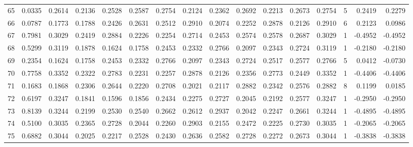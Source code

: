 \begin{tabular}{lrrrrrrrrrrrrrrr}
65  &      0.0335 &  0.2614 &  0.2136 &  0.2528 &  0.2587 &  0.2754 &  0.2124 &  0.2362 &  0.2692 &  0.2213 &   0.2673 &     0.2754 &      5 &                    0.2419 &                     0.2279 \\
66  &      0.0787 &  0.1773 &  0.1788 &  0.2426 &  0.2631 &  0.2512 &  0.2910 &  0.2074 &  0.2252 &  0.2878 &   0.2126 &     0.2910 &      6 &                    0.2123 &                     0.0986 \\
67  &      0.7981 &  0.3029 &  0.2419 &  0.2884 &  0.2226 &  0.2254 &  0.2714 &  0.2453 &  0.2574 &  0.2578 &   0.2687 &     0.3029 &      1 &                   -0.4952 &                    -0.4952 \\
68  &      0.5299 &  0.3119 &  0.1878 &  0.1624 &  0.1758 &  0.2453 &  0.2332 &  0.2766 &  0.2097 &  0.2343 &   0.2724 &     0.3119 &      1 &                   -0.2180 &                    -0.2180 \\
69  &      0.2354 &  0.1624 &  0.1758 &  0.2453 &  0.2332 &  0.2766 &  0.2097 &  0.2343 &  0.2724 &  0.2517 &   0.2577 &     0.2766 &      5 &                    0.0412 &                    -0.0730 \\
70  &      0.7758 &  0.3352 &  0.2322 &  0.2783 &  0.2231 &  0.2257 &  0.2878 &  0.2126 &  0.2356 &  0.2773 &   0.2449 &     0.3352 &      1 &                   -0.4406 &                    -0.4406 \\
71  &      0.1683 &  0.1868 &  0.2306 &  0.2644 &  0.2220 &  0.2708 &  0.2021 &  0.2117 &  0.2882 &  0.2342 &   0.2576 &     0.2882 &      8 &                    0.1199 &                     0.0185 \\
72  &      0.6197 &  0.3247 &  0.1841 &  0.1596 &  0.1856 &  0.2434 &  0.2275 &  0.2727 &  0.2045 &  0.2192 &   0.2577 &     0.3247 &      1 &                   -0.2950 &                    -0.2950 \\
73  &      0.8139 &  0.3244 &  0.2199 &  0.2530 &  0.2540 &  0.2662 &  0.2612 &  0.2937 &  0.2042 &  0.2247 &   0.2661 &     0.3244 &      1 &                   -0.4895 &                    -0.4895 \\
74  &      0.5100 &  0.3035 &  0.2365 &  0.2728 &  0.2044 &  0.2260 &  0.2903 &  0.2155 &  0.2472 &  0.2225 &   0.2730 &     0.3035 &      1 &                   -0.2065 &                    -0.2065 \\
75  &      0.6882 &  0.3044 &  0.2025 &  0.2217 &  0.2528 &  0.2430 &  0.2636 &  0.2582 &  0.2728 &  0.2272 &   0.2673 &     0.3044 &      1 &                   -0.3838 &                    -0.3838 \\

\end{tabular}
